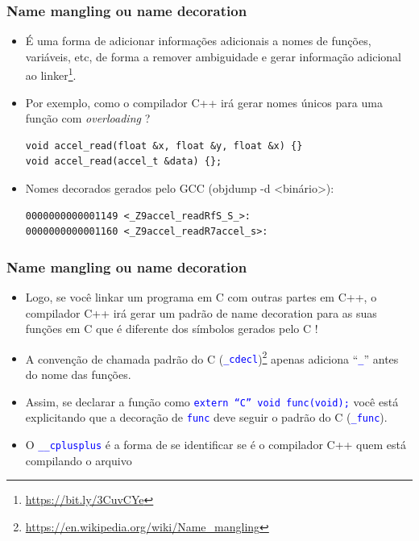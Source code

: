 \documentclass{beamer}
\begin{document}
\begin{frame}[fragile]
	\frametitle{Name mangling ou name decoration}
		\begin{itemize}
			\item É uma forma de adicionar informações adicionais a nomes de funções, variáveis, etc, de forma a remover ambiguidade e gerar informação adicional ao linker\footnote{{\tiny\url{ https://bit.ly/3CuvCYe}}}.
			\item Por exemplo, como o compilador C++ irá gerar nomes únicos para uma função com \textit{overloading} ?
            	\begin{lstlisting}[style=customc]
void accel_read(float &x, float &y, float &x) {}
void accel_read(accel_t &data) {};
            	\end{lstlisting}
               \item Nomes decorados gerados pelo GCC (objdump -d <binário>):
            	\begin{lstlisting}[style=customc]
0000000000001149 <_Z9accel_readRfS_S_>:
0000000000001160 <_Z9accel_readR7accel_s>:
            	\end{lstlisting}
		\end{itemize}
\end{frame}

\begin{frame}[fragile]
	\frametitle{Name mangling ou name decoration}
		\begin{itemize}
			\item Logo, se você linkar um programa em C com outras partes em C++, o compilador C++ irá gerar um padrão de name decoration para as suas funções em C que é diferente dos símbolos gerados pelo C !
           \item A convenção de chamada padrão do C (\texttt{\textcolor{blue}{\_cdecl}})\footnote{\tiny{\url{https://en.wikipedia.org/wiki/Name_mangling}}} apenas adiciona ``\texttt{\textcolor{blue}{\_}}'' antes do nome das funções.
           \item Assim, se declarar a função como \texttt{\textcolor{blue}{extern ``C'' void func(void);}} você está explicitando que a decoração de \texttt{\textcolor{blue}{func}} deve seguir o padrão do C (\texttt{\textcolor{blue}{\_func}}).
           \item O \texttt{\textcolor{blue}{\_\_cplusplus}} é a forma de se identificar se é o compilador C++ quem está compilando o arquivo
		\end{itemize}
\end{frame}
\end{document}
